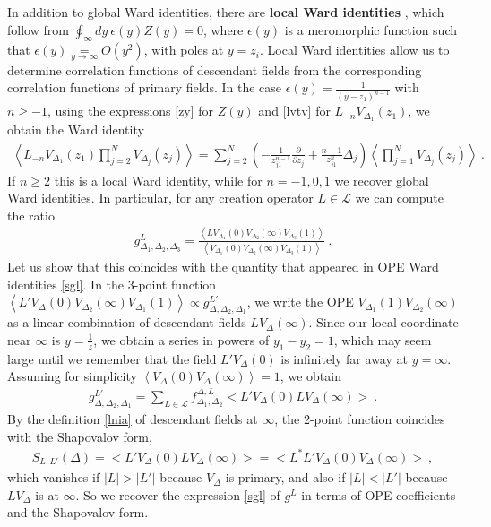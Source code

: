\documentclass[12pt, a4paper]{article}
\newcommand{\myindex}[1]{\textbf{\boldmath #1}}
\begin{document}
In addition to global Ward identities, there are \myindex{local Ward identities} , which follow from $\oint_\infty dy\ \epsilon(y)Z(y)=0$, where $\epsilon(y)$ is a meromorphic function such that $\epsilon(y)\underset{y\to\infty}{=}O(y^2)$, with poles at $y=z_i$. Local Ward identities allow us to determine correlation functions of descendant fields from the corresponding correlation functions of primary fields. In the case $\epsilon(y) = \frac{1}{(y-z_1)^{n-1}}$ with $n\geq -1$, using the expressions \eqref{zy} for $Z(y)$ and \eqref{lvtv} for $L_{-n}V_{\Delta_1}(z_1)$, we obtain the Ward identity
\begin{align}
 \left<L_{-n}V_{\Delta_1}(z_1)\prod_{j=2}^N V_{\Delta_j}(z_j)\right> = \sum_{j=2}^N \left(-\frac{1}{z_{j1}^{n-1}}\frac{\partial}{\partial z_j} +\frac{n-1}{z_{j1}^n} \Delta_j\right) \left<\prod_{j=1}^N V_{\Delta_j}(z_j)\right>\ . 
 \label{lwi}
\end{align}
If $n\geq 2$ this is a local Ward identity, while for $n=-1,0,1$ we recover global Ward identities. 
In particular, for any creation operator $L\in\mathcal{L}$ we can compute the ratio
\begin{align}
 g^L_{\Delta_1,\Delta_2,\Delta_3} = \frac{\left< LV_{\Delta_1}(0) V_{\Delta_2}(\infty)V_{\Delta_3}(1)\right>}{\left< V_{\Delta_1}(0) V_{\Delta_2}(\infty)V_{\Delta_3}(1)\right>}\ .
 \label{gl}
\end{align}
Let us show that this coincides with the quantity that appeared in OPE Ward identities \eqref{sgl}. 
In the 3-point function $\left< L'V_\Delta(0)V_{\Delta_2}(\infty)V_{\Delta_1}(1)\right>\propto g^{L'}_{\Delta,\Delta_2,\Delta_1}$, we write the OPE $V_{\Delta_1}(1)V_{\Delta_2}(\infty)$ as a linear combination of descendant fields $LV_{\Delta}(\infty)$. Since our local coordinate near $\infty$ is $y=\frac{1}{z}$, we obtain a series in powers of $y_1-y_2=1$, which may seem large until we remember that the field $L'V_{\Delta}(0)$ is infinitely far away at $y=\infty$. 
Assuming for simplicity $\left<V_\Delta(0) V_\Delta(\infty) \right>=1$, 
we obtain
\begin{align}
 g^{L'}_{\Delta,\Delta_2,\Delta_1}= \sum_{L\in\mathcal{L}} f^{\Delta,L}_{\Delta_1,\Delta_2} \Big<L'V_\Delta(0) LV_\Delta(\infty) \Big> \ .
 \label{gfr}
\end{align}
By the definition \eqref{lnia} of descendant fields at $\infty$, the 2-point function coincides with the Shapovalov form, 
\begin{align}
 \boxed{S_{L,L'}(\Delta)  = \Big<L'V_\Delta(0) LV_\Delta(\infty) \Big> =  \Big<L^*L'V_\Delta(0) V_\Delta(\infty) \Big>} \ , 
 \label{sll}
 \end{align}
which vanishes if $|L|>|L'|$ because $V_\Delta$ is primary, and also if $|L|<|L'|$ because $LV_\Delta$ is at $\infty$. So we recover the expression \eqref{sgl} of $g^L$ in terms of OPE coefficients and the Shapovalov form. 
\end{document}
